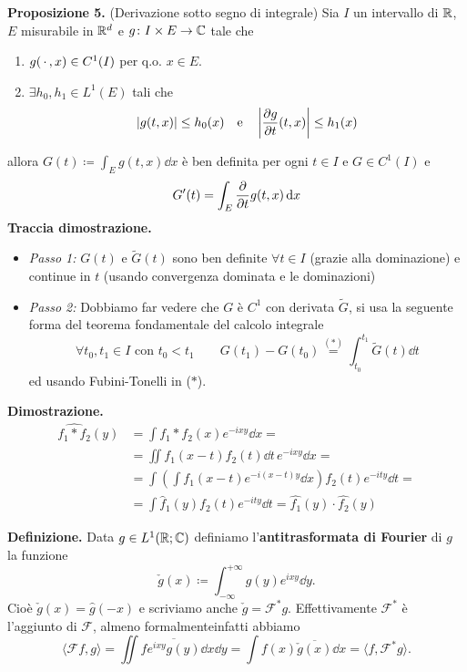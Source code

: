 \textbf{Proposizione 5.} (Derivazione sotto segno di integrale)
Sia $I$ un intervallo di $\mathbb R$, $E$ misurabile in $\mathbb R^d$ e $g \colon I \times E \to \mathbb C$ tale che
\begin{enumerate}
	\item $g(\,\cdot\,, x) \in C^1(I)$ per q.o. $x \in E$.
	\item $\exists h_0, h_1 \in L^1(E)$ tali che
		$$
		|g(t, x)| \leq h_0(x) 
		\quad
		\text{e}
		\quad
		\left|\frac{\partial g}{\partial t}(t, x)\right| \leq h_1(x)
		$$
\end{enumerate}
allora $G(t) \coloneqq \int_E g(t, x) \dd x$ è ben definita per ogni $t \in I$ e $G \in C^1(I)$ e
$$
G'(t) = \int_E \frac{\partial}{\partial t}g(t, x) \,\mathrm{d} x
$$
\textbf{Traccia dimostrazione.}
\begin{itemize}
	\item \textit{Passo 1:} $G(t)$ e $\tilde G(t)$ sono ben definite $\forall t \in I$ (grazie alla dominazione) e continue in $t$ (usando convergenza dominata e le dominazioni)
	\item \textit{Passo 2:} Dobbiamo far vedere che $G$ è $C^1$ con derivata $\tilde G$, si usa la seguente forma del teorema fondamentale del calcolo integrale
		$$
		\forall t_0, t_1 \in I \text{ con } t_0 < t_1
		\qquad
		G(t_1) - G(t_0) \overset{(*)}{=} \int_{t_0}^{t_1} \tilde G(t) \dd t
		$$
		ed usando Fubini-Tonelli in ($*$).
\end{itemize}


\textbf{Dimostrazione.}
$$
\begin{aligned}
	\hat{f_1 \ast f_2}(y)
	&= \int f_1 \ast f_2 (x) e^{-ixy} \dd x = \\
	&= \iint f_1(x - t) f_2(t) \dd t \, e^{-ixy} \dd x = \\
	&= \int \left(\int f_1(x - t) e^{-i(x - t)y} \dd x \right) f_2(t) e^{-ity} \dd t = \\
	&= \int \hat f_1(y) f_2(t) e^{-ity} \dd t = \hat{f_1}(y) \cdot \hat{f_2}(y)
\end{aligned}
$$

\textbf{Definizione.}
Data $g \in L^1(\mathbb R; \mathbb C)$ definiamo l'\textbf{antitrasformata di Fourier} di $g$ la funzione
$$
	\check g(x) \coloneqq \int_{-\infty}^{+\infty} g(y) e^{ixy} \dd y.
$$
Cioè $\check g(x) = \hat g(-x)$ e scriviamo anche $\check g = \mathcal F^* g$. Effettivamente $\mathcal F^*$ è l'aggiunto di $\mathcal F$, almeno formalmente\footnotemark infatti abbiamo
$$
	\langle \mathcal F f, g \rangle
	= \iint f \overline{e^{ixy} g(y)} \dd x \dd y
	= \int f(x) \overline{\check g(x)} \dd x
	= \langle f, \mathcal F^* g \rangle.
$$

